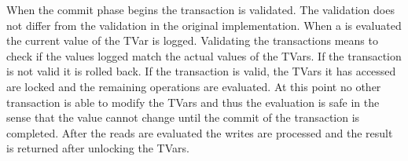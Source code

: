 When the commit phase
begins the transaction is validated. The validation does not differ from the validation in the original implementation.
When a  is evaluated the current value of the TVar is logged. Validating the transactions means to 
check if the values logged match the actual values of the TVars. If the transaction is not valid it is rolled back.
If the transaction is valid, the TVars it has accessed are locked and the remaining  operations are
evaluated. At this point no other transaction is able to modify the TVars and thus the evaluation is safe in the sense
that the value cannot change until the commit of the transaction is completed. After the reads are evaluated the 
writes are processed and the result is returned after unlocking the TVars.



